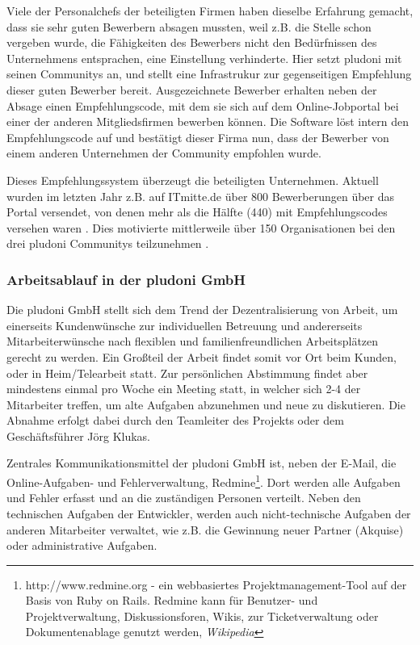 Viele der Personalchefs der beteiligten Firmen haben dieselbe Erfahrung gemacht, dass sie sehr guten Bewerbern absagen mussten, weil z.B. die Stelle schon vergeben wurde, die Fähigkeiten des Bewerbers nicht den Bedürfnissen des Unternehmens entsprachen, eine Einstellung verhinderte. Hier setzt pludoni mit seinen Communitys an, und stellt eine Infrastrukur zur gegenseitigen Empfehlung dieser guten Bewerber bereit.  Ausgezeichnete Bewerber erhalten neben der Absage einen Empfehlungscode, mit dem sie sich auf dem Online-Jobportal bei einer der anderen Mitgliedsfirmen bewerben können. Die Software löst intern den Empfehlungscode auf und bestätigt dieser Firma nun, dass der Bewerber von einem anderen Unternehmen der Community empfohlen wurde. 

Dieses Empfehlungssystem überzeugt die beteiligten Unternehmen. Aktuell wurden im letzten Jahr z.B. auf ITmitte.de über 800 Bewerberungen über das Portal versendet, von denen mehr als die Hälfte (440) mit Empfehlungscodes versehen waren \citep{joerg_klukas_startseite_2011}. Dies motivierte mittlerweile über 150 Organisationen bei den drei pludoni Communitys teilzunehmen \citep{joerg_klukas_referenzen_2011}.

\subsubsection{Arbeitsablauf in der pludoni GmbH}
\label{sec:arbeitsablauf}
Die pludoni GmbH stellt sich dem Trend der Dezentralisierung von Arbeit, um einerseits Kundenwünsche zur individuellen Betreuung und andererseits Mitarbeiterwünsche nach flexiblen und familienfreundlichen Arbeitsplätzen gerecht zu werden. Ein Großteil der Arbeit findet somit vor Ort beim Kunden, oder in Heim/Telearbeit statt.
Zur persönlichen Abstimmung findet aber mindestens einmal pro Woche ein Meeting statt, in welcher sich 2-4 der Mitarbeiter treffen, um alte Aufgaben abzunehmen und neue zu diskutieren. Die Abnahme erfolgt dabei durch den Teamleiter des Projekts oder dem Geschäftsführer Jörg Klukas.

Zentrales Kommunikationsmittel der pludoni GmbH ist, neben der E-Mail, die Online-Aufgaben- und Fehlerverwaltung, Redmine\footnote{http://www.redmine.org - ein webbasiertes Projektmanagement-Tool auf der Basis von Ruby on Rails. Redmine kann für Benutzer- und Projektverwaltung, Diskussionsforen, Wikis, zur Ticketverwaltung oder Dokumentenablage genutzt werden, \textit{Wikipedia}}. Dort werden alle Aufgaben und Fehler erfasst und an die zuständigen Personen verteilt. 
Neben den technischen Aufgaben der Entwickler, werden auch nicht-technische Aufgaben der anderen Mitarbeiter verwaltet, wie z.B. die Gewinnung neuer Partner (Akquise) oder administrative Aufgaben. 

